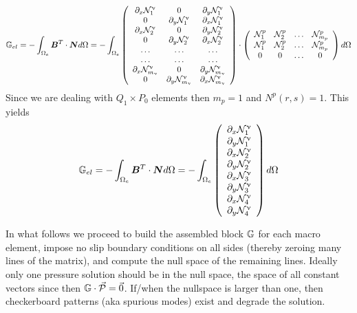 \[
{\mathbb{G}}_{el} = -\int_{\Omega_e} {\bm B}^T \cdot {\bm N} d\Omega
= -\int_{\Omega_e}
\left(
\begin{array}{ccc}
\partial_x {\mathcal{N}}_1^\upnu & 0 & \partial_y {\mathcal{N}}_1^\upnu \\
0 & \partial_y {\mathcal{N}}_1^\upnu & \partial_x {\mathcal{N}}_1^\upnu \\
\partial_x {\mathcal{N}}_2^\upnu & 0 & \partial_y {\mathcal{N}}_2^\upnu \\
0 & \partial_y {\mathcal{N}}_2^\upnu & \partial_x {\mathcal{N}}_2^\upnu \\
\dots & \dots & \dots \\
\dots & \dots & \dots \\
\partial_x {\mathcal{N}}_{m_\upnu}^\upnu & 0 & \partial_y {\mathcal{N}}_{m_\upnu}^\upnu \\
0 & \partial_y {\mathcal{N}}_{m_\upnu}^\upnu & \partial_x {\mathcal{N}}_{m_\upnu}^\upnu 
\end{array}
\right)
\cdot
\left(
\begin{array}{cccc}
{\mathcal{N}}_1^p & {\mathcal{N}}_2^p & \dots & {\mathcal{N}}_{m_p}^p \\ 
{\mathcal{N}}_1^p & {\mathcal{N}}_2^p & \dots & {\mathcal{N}}_{m_p}^p \\ 
0 & 0 & \dots & 0
\end{array}
\right)
d\Omega
\]
Since we are dealing with $Q_1\times P_0$ elements then $m_p=1$ and $N^p(r,s)=1$.
This yields
\[
{\mathbb{G}}_{el} = -\int_{\Omega_e} {\bm B}^T \cdot {\bm N} d\Omega
= -\int_{\Omega_e}
\left(
\begin{array}{ccc}
\partial_x {\mathcal{N}}_1^\upnu \\
\partial_y {\mathcal{N}}_1^\upnu \\
\partial_x {\mathcal{N}}_2^\upnu \\
\partial_y {\mathcal{N}}_2^\upnu \\
\partial_x {\mathcal{N}}_3^\upnu \\
\partial_y {\mathcal{N}}_3^\upnu \\
\partial_x {\mathcal{N}}_4^\upnu \\
\partial_y {\mathcal{N}}_4^\upnu 
\end{array}
\right)
d\Omega
\]

In what follows we proceed to build the assembled block ${\mathbb{G}}$ for each macro element, 
impose no slip boundary conditions on all sides (thereby zeroing many lines of the
matrix), and compute the null space of the remaining lines. 
Ideally only one pressure solution should be in the null space, the space of 
all constant vectors since then ${\mathbb{G}} \cdot \vec{\cal P}=\vec{0}$.
If/when the nullspace is larger than one, then checkerboard patterns (aka 
spurious modes) exist and degrade the solution. 

